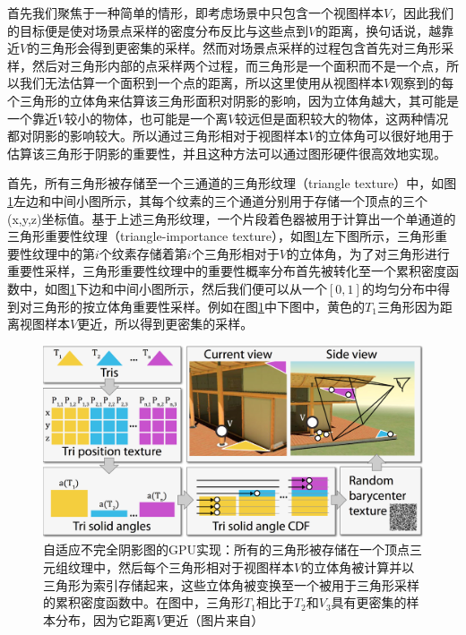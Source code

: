 首先我们聚焦于一种简单的情形，即考虑场景中只包含一个视图样本$V$，因此我们的目标便是使对场景点采样的密度分布反比与这些点到$V$的距离，换句话说，越靠近$V$的三角形会得到更密集的采样。然而对场景点采样的过程包含首先对三角形采样，然后对三角形内部的点采样两个过程，而三角形是一个面积而不是一个点，所以我们无法估算一个面积到一个点的距离，所以这里使用从视图样本$V$观察到的每个三角形的立体角来估算该三角形面积对阴影的影响，因为立体角越大，其可能是一个靠近$V$较小的物体，也可能是一个离$V$较远但是面积较大的物体，这两种情况都对阴影的影响较大。所以通过三角形相对于视图样本$V$的立体角可以很好地用于估算该三角形于阴影的重要性，并且这种方法可以通过图形硬件很高效地实现。

首先，所有三角形被存储至一个三通道的三角形纹理（triangle texture）中，如图\ref{f:adaptive-ISMs}左边和中间小图所示，其每个纹素的三个通道分别用于存储一个顶点的三个(x,y,z)坐标值。基于上述三角形纹理，一个片段着色器被用于计算出一个单通道的三角形重要性纹理（triangle-importance texture），如图\ref{f:adaptive-ISMs}左下图所示，三角形重要性纹理中的第$i$个纹素存储着第$i$个三角形相对于$V$的立体角，为了对三角形进行重要性采样，三角形重要性纹理中的重要性概率分布首先被转化至一个累积密度函数中，如图\ref{f:adaptive-ISMs}下边和中间小图所示，然后我们便可以从一个$[0,1]$的均匀分布中得到对三角形的按立体角重要性采样。例如在图\ref{f:adaptive-ISMs}中下图中，黄色的$T_1$三角形因为距离视图样本$V$更近，所以得到更密集的采样。

\begin{figure}
	\includegraphics[width=1.\textwidth]{figures/ir/ir-5-4}
	\caption{自适应不完全阴影图的GPU实现：所有的三角形被存储在一个顶点三元组纹理中，然后每个三角形相对于视图样本$V$的立体角被计算并以三角形为索引存储起来，这些立体角被变换至一个被用于三角形采样的累积密度函数中。在图中，三角形$T_1$相比于$T_2$和$V_3$具有更密集的样本分布，因为它距离$V$更近（图片来自\cite{a:MakingImperfectShadowMapsViewAdaptive}）}
	\label{f:adaptive-ISMs}
\end{figure}


